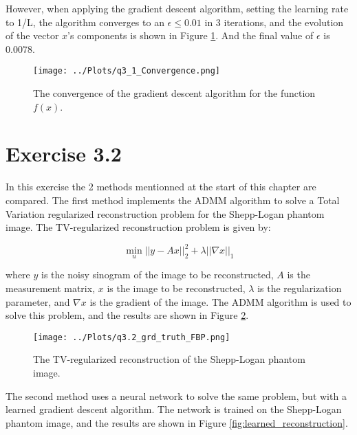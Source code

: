 \documentclass[12pt]{report} %
\begin{document}
However, when applying the gradient descent algorithm, setting the learning rate to 1/L, the algorithm converges to an $\epsilon \leq 0.01$ in 3 iterations, and the evolution of the vector $x$'s components is shown in Figure \ref{fig:gradient_descent}. And the final value of $\epsilon$ is 0.0078.

\begin{figure}[htbp]
    \centering
    \texttt{[image: ../Plots/q3\_1\_Convergence.png]}
    \caption{The convergence of the gradient descent algorithm for the function $f(x)$.}
    \label{fig:gradient_descent}
\end{figure}



\section{Exercise 3.2}

In this exercise the 2 methods mentionned at the start of this chapter are compared. The first method implements the ADMM algorithm\cite{boyd2011distributed} to solve a Total Variation regularized reconstruction problem for the Shepp-Logan phantom image. The TV-regularized reconstruction problem is given by:

\begin{equation}
    \min_{u} ||y - Ax||^2_2 + \lambda ||\nabla x||_1
\end{equation}

where $y$ is the noisy sinogram of the image to be reconstructed, $A$ is the measurement matrix, $x$ is the image to be reconstructed, $\lambda$ is the regularization parameter, and $\nabla x$ is the gradient of the image. The ADMM algorithm is used to solve this problem, and the results are shown in Figure \ref{fig:tv_reconstruction}.

\begin{figure}[htbp]
    \centering
    \texttt{[image: ../Plots/q3.2\_grd\_truth\_FBP.png]}
    \caption{The TV-regularized reconstruction of the Shepp-Logan phantom image.}
    \label{fig:tv_reconstruction}
\end{figure}

The second method uses a neural network to solve the same problem, but with a learned gradient descent algorithm. The network is trained on the Shepp-Logan phantom image, and the results are shown in Figure \ref{fig:learned_reconstruction}.

\end{document}
